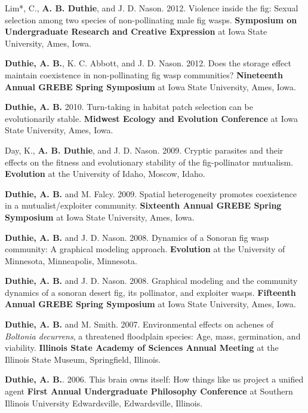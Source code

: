 \documentclass[letterpaper]{article}
\renewenvironment{itemize}{
  \begin{list}{}{
    \setlength{\leftmargin}{1.5em}
  }
}{
  \end{list}
}
\begin{document}
\begin{itemize}
\item Lim*, C., {\bf A. B. Duthie}, and J. D. Nason. 2012. Violence inside the fig: Sexual selection among two species of non-pollinating male fig wasps. {\bf Symposium on Undergraduate Research and Creative Expression} at Iowa State University, Ames, Iowa.
\item {\bf Duthie, A. B.}, K. C. Abbott, and J. D. Nason. 2012. Does the storage effect maintain coexistence in non-pollinating fig wasp communities? {\bf Nineteenth Annual GREBE Spring Symposium} at Iowa State University, Ames, Iowa.
\item {\bf Duthie, A. B.} 2010. Turn-taking in habitat patch selection can be evolutionarily stable. {\bf Midwest Ecology and Evolution Conference} at Iowa State University, Ames, Iowa.
\item Day, K., {\bf A. B. Duthie}, and J. D. Nason. 2009. Cryptic parasites and their effects on the fitness and evolutionary stability of the fig-pollinator mutualism. {\bf Evolution} at the University of Idaho, Moscow, Idaho.
\item {\bf Duthie, A. B.} and M. Falcy. 2009. Spatial heterogeneity promotes coexistence in a mutualist/exploiter community. {\bf Sixteenth Annual GREBE Spring Symposium} at Iowa State University, Ames, Iowa.
\item {\bf Duthie, A. B.} and J. D. Nason. 2008. Dynamics of a Sonoran fig wasp community: A graphical modeling approach. {\bf Evolution} at the University of Minnesota, Minneapolis, Minnesota.
\item {\bf Duthie, A. B.} and J. D. Nason. 2008. Graphical modeling and the community dynamics of a sonoran desert fig, its pollinator, and exploiter wasps. {\bf Fifteenth Annual GREBE Spring Symposium} at Iowa State University, Ames, Iowa.
\item {\bf Duthie, A. B.} and M. Smith. 2007. Environmental effects on achenes of {\it Boltonia decurrens}, a threatened floodplain species: Age, mass, germination, and viability. {\bf Illinois State Academy of Sciences Annual Meeting} at the Illinois State Museum, Springfield, Illinois.
\item {\bf Duthie, A. B.}. 2006. This brain owns itself: How things like us project a unified agent {\bf First Annual Undergraduate Philosophy Conference} at Southern Illinois University Edwardsville, Edwardsville, Illinois.
\end{itemize}
\end{document}
